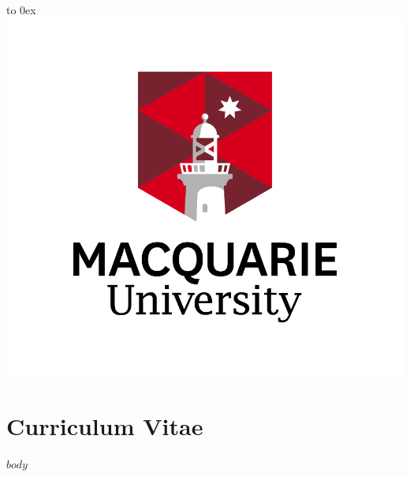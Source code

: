 \documentclass[10pt, a4paper]{article}
\begin{document}
\begin{flushright}%
    \vbox to 0ex{\includegraphics[scale=0.6]{../images/newmulogo.png}\vss}%
\end{flushright}%

\section{Curriculum Vitae}

$body$
\end{document}
